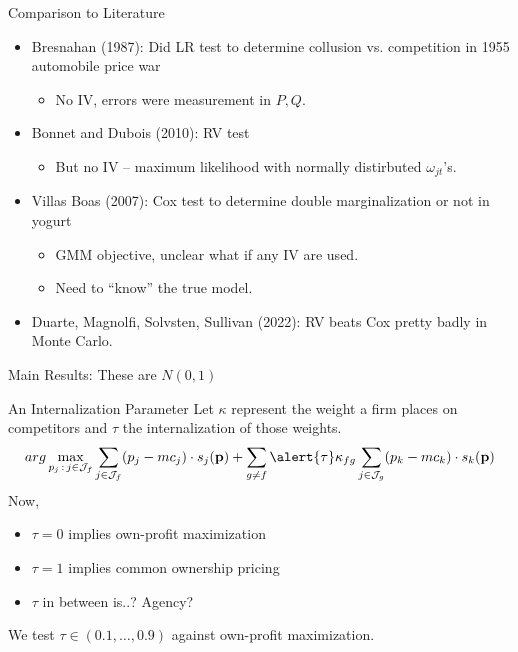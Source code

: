 \documentclass[xcolor=pdftex,dvipsnames,table,mathserif,aspectratio=169]{beamer}
\begin{document}
\begin{frame}{Comparison to Literature}
\begin{itemize}
\item Bresnahan (1987): Did LR test to determine collusion vs. competition in 1955 automobile price war
\begin{itemize}
\item No IV, errors were measurement in $P,Q$.
\end{itemize}
\item Bonnet and Dubois (2010): RV test
\begin{itemize}
\item But no IV -- maximum likelihood with normally distirbuted $\omega_{jt}$'s.
\end{itemize}
\item Villas Boas (2007): Cox test to determine double marginalization or not in yogurt
\begin{itemize}
\item GMM objective, unclear what if any IV are used.
\item Need to ``know'' the true model.
\end{itemize}
\item Duarte, Magnolfi, Solvsten, Sullivan (2022): RV beats Cox pretty badly in Monte Carlo.
\end{itemize}
\end{frame}




\begin{frame}[plain,label=mainresults]{Main Results: These are $N(0,1)$}
\begin{center}
\scalebox{0.55}{}
\end{center}
\end{frame}

\begin{frame}[plain]{An Internalization Parameter}
Let $\kappa$ represent the weight a firm places on competitors and $\tau$ the internalization of those weights.
 \begin{equation*}
 arg\max_{p_j \,:\, j \in \mathcal{J}_f} \sum_{j \in \mathcal{J}_f} (p_j - mc_j) \cdot s_j(\mathbf{p})+
 \sum_{g\neq f} \alert{\tau} \kappa_{fg} \sum_{j \in \mathcal{J}_g} (p_k - mc_k) \cdot s_k(\mathbf{p})
 \end{equation*}
Now, 
\begin{itemize}
\item $\tau = 0$ implies own-profit maximization
\item $\tau = 1$ implies common ownership pricing
\item $\tau$ in between is..? Agency?
\end{itemize}
We test $\tau \in (0.1, \ldots, 0.9)$ against own-profit maximization.
\end{frame}
\end{document}
